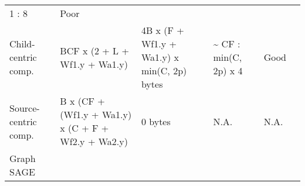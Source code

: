 \documentclass[10pt,oneside]{memoir}
\begin{document}
\begin{longtable}[]{@{}llllll@{}}
\begin{minipage}[t]{0.19\columnwidth}
1 : 8\strut
\end{minipage} & \begin{minipage}[t]{0.11\columnwidth}\raggedright
Poor\strut
\end{minipage} & \begin{minipage}[t]{0.12\columnwidth}\raggedright
\strut
\end{minipage}\tabularnewline
\begin{minipage}[t]{0.19\columnwidth}\raggedright
Child-centric comp.\strut
\end{minipage} & \begin{minipage}[t]{0.10\columnwidth}\raggedright
BCF x (2 + L + Wf1.y + Wa1.y)\strut
\end{minipage} & \begin{minipage}[t]{0.13\columnwidth}\raggedright
4B x (F + Wf1.y + Wa1.y) x min(C, 2p) bytes\strut
\end{minipage} & \begin{minipage}[t]{0.19\columnwidth}\raggedright
\textasciitilde{} CF : min(C, 2p) x 4\strut
\end{minipage} & \begin{minipage}[t]{0.11\columnwidth}\raggedright
Good\strut
\end{minipage} & \begin{minipage}[t]{0.12\columnwidth}\raggedright
\strut
\end{minipage}\tabularnewline
\begin{minipage}[t]{0.19\columnwidth}\raggedright
Source-centric comp.\strut
\end{minipage} & \begin{minipage}[t]{0.10\columnwidth}\raggedright
B x (CF + (Wf1.y + Wa1.y) x (C + F + Wf2.y + Wa2.y)\strut
\end{minipage} & \begin{minipage}[t]{0.13\columnwidth}\raggedright
0 bytes\strut
\end{minipage} & \begin{minipage}[t]{0.19\columnwidth}\raggedright
N.A.\strut
\end{minipage} & \begin{minipage}[t]{0.11\columnwidth}\raggedright
N.A.\strut
\end{minipage} & \begin{minipage}[t]{0.12\columnwidth}\raggedright
\strut
\end{minipage}\tabularnewline
\begin{minipage}[t]{0.19\columnwidth}\raggedright
Graph SAGE\strut
\end{minipage} & \begin{minipage}[t]{0.10\columnwidth}\raggedright

\end{minipage}
\end{longtable}
\end{document}
